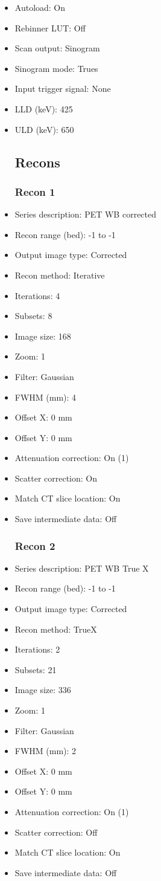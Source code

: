 \documentclass[12pt]{article}
\begin{document}
\begin{itemize}
\subsection{Scan}
\item Autoload: On
\item Rebinner LUT: Off
\item Scan output: Sinogram
\item Sinogram mode: Trues
\item Input trigger signal: None
\item LLD (keV): 425
\item ULD (keV): 650
\subsection{Recons}
\subsubsection{Recon 1}
\item Series description: PET WB corrected 
\item Recon range (bed): -1 to -1
\item Output image type: Corrected
\item Recon method: Iterative
\item Iterations: 4
\item Subsets: 8
\item Image size: 168
\item Zoom: 1
\item Filter: Gaussian
\item FWHM (mm): 4
\item Offset X: 0 mm
\item Offset Y: 0 mm
\item Attenuation correction: On (1)
\item Scatter correction: On
\item Match CT slice location: On
\item Save intermediate data: Off
\subsubsection{Recon 2}
\item Series description: PET WB True X
\item Recon range (bed): -1 to -1
\item Output image type: Corrected
\item Recon method: TrueX
\item Iterations: 2
\item Subsets: 21
\item Image size: 336
\item Zoom: 1
\item Filter: Gaussian
\item FWHM (mm): 2
\item Offset X: 0 mm
\item Offset Y: 0 mm
\item Attenuation correction: On (1)
\item Scatter correction: Off
\item Match CT slice location: On
\item Save intermediate data: Off
\end{itemize}
\end{document}
